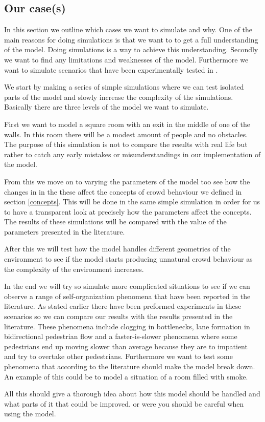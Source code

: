 \subsection{Our case(s)}\label{ourCases}
In this section we outline which cases we want to simulate and why.
One of the main reasons for doing simulations is that we want to to get 
a full understanding of the model. Doing simulations is a way to achieve this
understanding. Secondly we want to find any limitations and weaknesses of the 
model. Furthermore we want to simulate scenarios that have been experimentally 
tested in \citep{self-org}.

We start by making a series of simple simulations  where we can test isolated parts of the model and slowly increase the complexity of the simulations. Basically there are three levels of the model we want to simulate. 

First we want to model a square room with an exit in the middle of one of the walls. In this room there will be a modest amount of people and no obstacles. The purpose of this simulation is not to compare the results with real life but rather to catch any early mistakes or misunderstandings in our implementation of the model.

From this we move on to varying the parameters of the model too see how the changes in in the these affect the concepts of crowd behaviour we defined in section \ref{concepts}. This will be done in the same simple simulation in order for us to have a transparent look at precisely how the parameters affect the concepts. The results of these simulations will be compared with the value of the parameters presented in the literature.

After this we will test how the model handles different geometries of the environment to see if the model starts producing unnatural crowd behaviour as the complexity of the environment increases. 

In the end we will try so simulate more complicated situations to see if we can observe a range of self-organization phenomena that have been reported in the literature. As stated earlier there have been preformed experiments in these scenarios so we can compare our results with the results presented in the literature. These phenomena include clogging in bottlenecks, lane formation in bidirectional pedestrian flow and a faster-is-slower phenomena where some pedestrians end up moving slower than average because they are to impatient and try to overtake other pedestrians\cite{self-org}. Furthermore we want to test some phenomena  that according to the literature should make the model break down. An example of this could be to model a situation of a room filled with smoke.   

All this should give a thorough idea about how this model should be handled and what parts of it that could be improved. or were you should be careful when using the model.